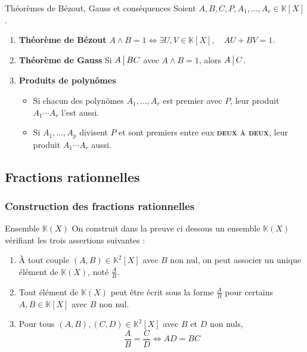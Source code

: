     \begin{theo}{Théorèmes de Bézout, Gauss et conséquences}{}
        Soient $A,B,C,P,A_1,\ldots,A_r \in \mathbb{K}[X]$.
        \begin{enumerate}
            \item \textbf{Théorème de Bézout} \quad $A \wedge B = 1 \iff \exists U,V \in \mathbb{K}[X], \quad AU + BV = 1$.
            \item \textbf{Théorème de Gauss} \quad Si $A \, \big| \, BC$ avec $A \wedge B = 1$, alors $A \, \big| \, C$.
            \item \textbf{Produits de polynômes} 
            \begin{itemize}
                \item Si chacun des polynômes $A_1,\ldots,A_r$ est premier avec $P$, leur produit $A_1 \cdots A_r$ l’est aussi.
                \item Si $A_1,\ldots,A_p$ divisent $P$ et sont premiers entre eux \textsc{\textbf{deux à deux}}, leur produit $A_1 \cdots A_r$ aussi.
            \end{itemize}
        \end{enumerate}
    \end{theo}

\subsection{Fractions rationnelles}

    \subsubsection{Construction des fractions rationnelles}

    \begin{defi}{Ensemble $\mathbb{K}(X)$}{}
        On construit dans la preuve ci dessous un ensemble $\mathbb{K}(X)$ vérifiant les trois assertions suivantes :
        \begin{enumerate}[label=\textcolor{myyellow}{\textbf{(\arabic*)}}]
            \item À tout couple $(A,B) \in \mathbb{K}^2[X]$ avec $B$ non nul, on peut associer un unique élément de $\mathbb{K}(X)$, noté $\frac{A}{B}$.
            \item Tout élément de $\mathbb{K}(X)$ peut être écrit sous la forme $\frac{A}{B}$ pour certains $A,B \in \mathbb{K}[X]$ avec $B$ non nul.
            \item Pour tous $(A,B), (C,D) \in \mathbb{K}^2[X]$ avec $B$ et $D$ non nuls, 
            \[ \frac{A}{B} = \frac{C}{D} \iff AD = BC \]
        \end{enumerate}
    \end{defi}

